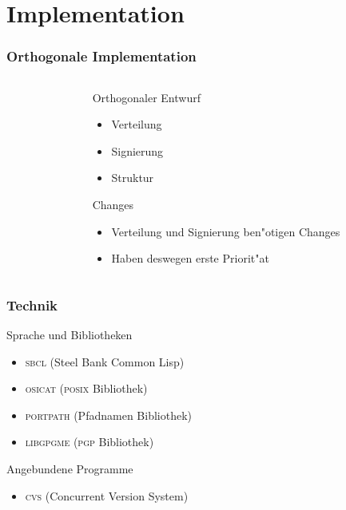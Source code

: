 \documentclass[german, presentation]{beamer}
\newcommand{\PGP}{\textsc{pgp}}
\newcommand{\SBCL}{\textsc{sbcl}}
\newcommand{\CVS}{\textsc{cvs}}
\newcommand{\LIBGPGME}{\textsc{libgpgme}}
\newcommand{\OSICAT}{\textsc{osicat}}
\newcommand{\PORTPATH}{\textsc{portpath}}
\newcommand{\POSIX}{\textsc{posix}}
\begin{document}
\section{Implementation}

\begin{frame}
  \frametitle{Orthogonale Implementation}
  \begin{columns}[c]
    \begin{column}{0.5\textwidth}
      
    \end{column}
    \begin{column}{0.5\textwidth}
      \begin{block}{Orthogonaler Entwurf}
        \begin{itemize}
        \item Verteilung 
        \item Signierung
        \item Struktur
        \end{itemize}
      \end{block}
      \begin{block}{Changes}
        \begin{itemize}
        \item Verteilung und Signierung ben"otigen
          Changes
        \item Haben deswegen erste Priorit"at
        \end{itemize}
      \end{block}

    \end{column}
  \end{columns}
\end{frame}

\begin{frame}
  \frametitle{Technik}
  \begin{block}{Sprache und Bibliotheken}
    \begin{itemize}
    \item \SBCL{} (Steel Bank Common Lisp)
    \item \OSICAT{} (\POSIX{} Bibliothek)
    \item \PORTPATH{} (Pfadnamen Bibliothek)
    \item \LIBGPGME{} (\PGP{} Bibliothek)
    \end{itemize}
  \end{block}
  \begin{block}{Angebundene Programme}
    \begin{itemize}
    \item \CVS{} (Concurrent Version System)
    \end{itemize}
  \end{block}
\end{frame}
\end{document}
